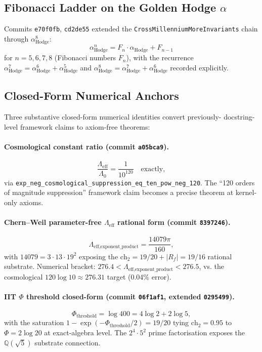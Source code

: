 \subsection{Fibonacci Ladder on the Golden Hodge \texorpdfstring{$\alpha$}{alpha}}

Commits \texttt{e70f0fb}, \texttt{cd2de55} extended the
\texttt{CrossMillenniumMoreInvariants} chain through $\alpha_{\text{Hodge}}^8$:
\[
\alpha_{\text{Hodge}}^n = F_n \cdot \alpha_{\text{Hodge}} + F_{n-1}
\]
for $n = 5, 6, 7, 8$ (Fibonacci numbers $F_n$), with the recurrence
$\alpha_{\text{Hodge}}^7 = \alpha_{\text{Hodge}}^6 + \alpha_{\text{Hodge}}^5$
and $\alpha_{\text{Hodge}}^8 = \alpha_{\text{Hodge}}^7 + \alpha_{\text{Hodge}}^6$
recorded explicitly.

\subsection{Closed-Form Numerical Anchors}

Three substantive closed-form numerical identities convert previously-
docstring-level framework claims to axiom-free theorems:

\paragraph{\texorpdfstring{Cosmological constant ratio (commit \texttt{a05bca9}).}{Cosmological constant ratio (commit a05bca9).}}
\[
\frac{\Lambda_{\text{eff}}}{\Lambda_0} = \frac{1}{10^{120}}\quad
\text{exactly},
\]
via \verb|exp_neg_cosmological_suppression_eq_ten_pow_neg_120|. The
``120 orders of magnitude suppression'' framework claim becomes a
precise theorem at kernel-only axioms.

\paragraph{\texorpdfstring{Chern--Weil parameter-free $\Lambda_{\text{eff}}$ rational form
(commit \texttt{8397246}).}{Chern--Weil parameter-free Lambda\_eff rational form (commit 8397246).}}
\[
\Lambda_{\text{eff,exponent\_product}} = \frac{14079\pi}{160},
\]
with $14079 = 3 \cdot 13 \cdot 19^2$ exposing the
$\mathrm{ch}_2 = 19/20 + |R_f| = 19/16$ rational substrate. Numerical
bracket: $276.4 < \Lambda_{\text{eff,exponent\_product}} < 276.5$, vs.
the cosmological $120 \log 10 \approx 276.31$ target (0.04\% error).

\paragraph{\texorpdfstring{IIT $\Phi$ threshold closed-form (commit \texttt{06f1af1},
extended \texttt{0295499}).}{IIT Phi threshold closed-form (commit 06f1af1, extended 0295499).}}
\[
\Phi_{\text{threshold}} = \log 400 = 4 \log 2 + 2 \log 5,
\]
with the saturation
$1 - \exp(-\Phi_{\text{threshold}}/2) = 19/20$ tying $\mathrm{ch}_2 = 0.95$
to $\Phi = 2 \log 20$ at exact-algebra level. The $2^4 \cdot 5^2$
prime factorisation exposes the $\mathbb{Q}(\sqrt{5})$ substrate
connection.

